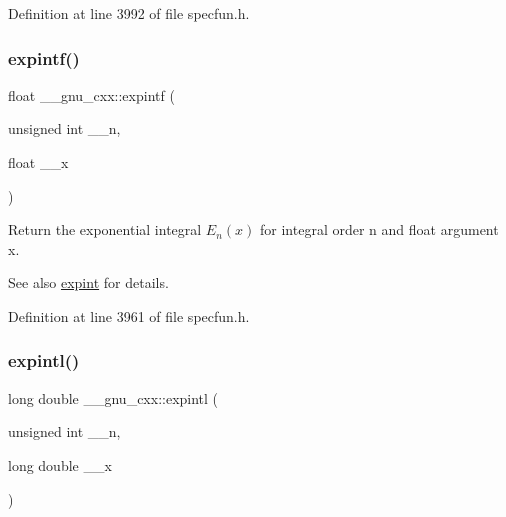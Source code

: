 Definition at line 3992 of file specfun.\+h.

\mbox{\label{group__mathsf__gnu_ga85751691a29807d99e990fcba61312f3}} 
\subsubsection{\texorpdfstring{expintf()}{expintf()}}
{\footnotesize\ttfamily float \+\_\+\+\_\+gnu\+\_\+cxx\+::expintf (\begin{DoxyParamCaption}\item[{unsigned int}]{\+\_\+\+\_\+n,  }\item[{float}]{\+\_\+\+\_\+x }\end{DoxyParamCaption})\hspace{0.3cm}{\ttfamily [inline]}}

Return the exponential integral $ E_n(x) $ for integral order {\ttfamily n} and {\ttfamily float} argument {\ttfamily x}.

\begin{DoxySeeAlso}{See also}
\hyperlink{group__mathsf__gnu_gadaf9317953b826975da72d1858f01ea5}{expint} for details. 
\end{DoxySeeAlso}


Definition at line 3961 of file specfun.\+h.

\mbox{\label{group__mathsf__gnu_ga720ca0b275784c8b82193f427a2b3553}} 
\subsubsection{\texorpdfstring{expintl()}{expintl()}}
{\footnotesize\ttfamily long double \+\_\+\+\_\+gnu\+\_\+cxx\+::expintl (\begin{DoxyParamCaption}\item[{unsigned int}]{\+\_\+\+\_\+n,  }\item[{long double}]{\+\_\+\+\_\+x }\end{DoxyParamCaption})\hspace{0.3cm}{\ttfamily [inline]}}

